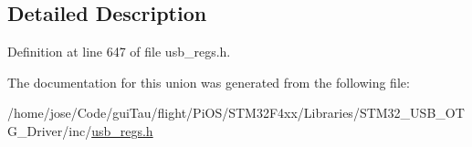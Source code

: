 \subsection{Detailed Description}


Definition at line 647 of file usb\-\_\-regs.\-h.



The documentation for this union was generated from the following file\-:\begin{DoxyCompactItemize}
\item 
/home/jose/\-Code/gui\-Tau/flight/\-Pi\-O\-S/\-S\-T\-M32\-F4xx/\-Libraries/\-S\-T\-M32\-\_\-\-U\-S\-B\-\_\-\-O\-T\-G\-\_\-\-Driver/inc/\hyperlink{_s_t_m32_f4xx_2_libraries_2_s_t_m32___u_s_b___o_t_g___driver_2inc_2usb__regs_8h}{usb\-\_\-regs.\-h}\end{DoxyCompactItemize}
